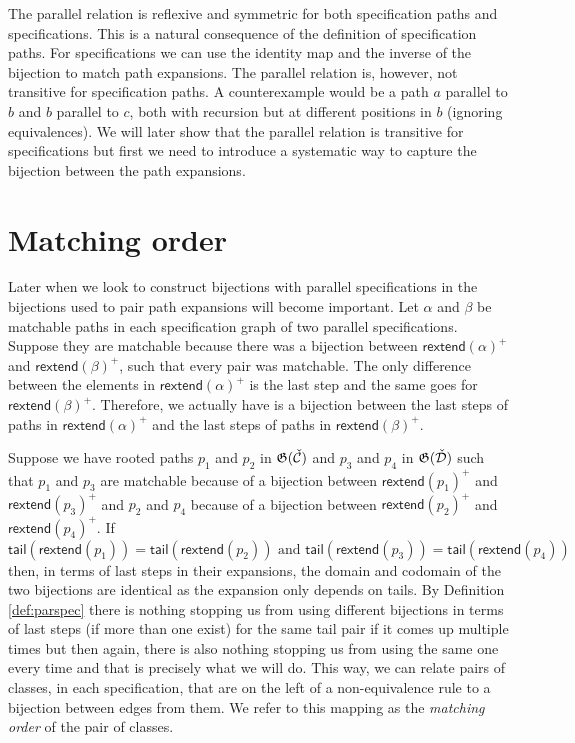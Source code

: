 The parallel relation is reflexive and symmetric for both specification paths and specifications. This is a natural consequence of the definition of specification paths. For specifications we can use the identity map and the inverse of the bijection to match path expansions. The parallel relation is, however, not transitive for specification paths. A counterexample would be a path $a$ parallel to $b$ and $b$ parallel to $c$, both with recursion but at different positions in $b$ (ignoring equivalences). We will later show that the parallel relation is transitive for specifications but first we need to introduce a systematic way to capture the bijection between the path expansions.

\section{Matching order}
Later when we look to construct bijections with parallel specifications in  the bijections used to pair path expansions will become important. Let $\alpha$ and $\beta$ be matchable paths in each specification graph of two parallel specifications. Suppose they are matchable because there was a bijection between $\textsf{rextend}(\alpha)^+$ and $\textsf{rextend}(\beta)^+$, such that every pair was matchable. The only difference between the elements in $\textsf{rextend}(\alpha)^+$ is the last step and the same goes for $\textsf{rextend}(\beta)^+$. Therefore, we actually have is a bijection between the last steps of paths in $\textsf{rextend}(\alpha)^+$ and the last steps of paths in $\textsf{rextend}(\beta)^+$. 

Suppose we have rooted paths $p_1$ and $p_2$ in $\mathfrak{G}(\check{\mathcal{C}})$ and $p_3$ and $p_4$ in $\mathfrak{G}(\check{\mathcal{D}})$ such that $p_1$ and $p_3$ are matchable because of a bijection between $\textsf{rextend}(p_1)^+$ and $\textsf{rextend}(p_3)^+$ and $p_2$ and $p_4$ because of a bijection between $\textsf{rextend}(p_2)^+$ and $\textsf{rextend}(p_4)^+$. If
\[
    \textsf{tail}(\textsf{rextend}(p_1)) = \textsf{tail}(\textsf{rextend}(p_2)) \text{ and } \textsf{tail}(\textsf{rextend}(p_3))=\textsf{tail}(\textsf{rextend}(p_4))
\]
then, in terms of last steps in their expansions, the domain and codomain of the two bijections are identical as the expansion only depends on tails. By Definition \ref{def:parspec} there is nothing stopping us from using different bijections in terms of last steps (if more than one exist) for the same tail pair if it comes up multiple times but then again, there is also nothing stopping us from using the same one every time and that is precisely what we will do. This way, we can relate pairs of classes, in each specification, that are on the left of a non-equivalence rule to a bijection between edges from them. We refer to this mapping as the \emph{matching order} of the pair of classes.

